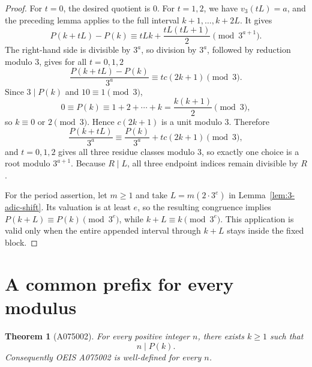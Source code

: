 \documentclass[11pt]{amsart}
\newtheorem{theorem}{Theorem}[section]
\theoremstyle{remark}
\begin{document}
\begin{proof}
For \(t=0\), the desired quotient is \(0\).  For \(t=1,2\), we have
\(v_3(tL)=a\), and the preceding lemma applies to the full interval
\(k+1,\ldots,k+2L\).  It gives
\[
P(k+tL)-P(k)
 \equiv tLk+\frac{tL(tL+1)}2\pmod{3^{a+1}}.
\]
The right-hand side is divisible by \(3^a\), so division by \(3^a\), followed by
reduction modulo \(3\), gives for all \(t=0,1,2\)
\begin{equation}\label{eq:3-adic-sweep}
\frac{P(k+tL)-P(k)}{3^a}
 \equiv tc(2k+1)\pmod3.
\end{equation}
Since \(3\mid P(k)\) and \(10\equiv1\pmod3\),
\[
0\equiv P(k)\equiv1+2+\cdots+k=\frac{k(k+1)}2\pmod3,
\]
so \(k\equiv0\) or \(2\pmod3\).  Hence \(c(2k+1)\) is a unit modulo \(3\).  Therefore
\[
\frac{P(k+tL)}{3^a}
 \equiv \frac{P(k)}{3^a}+tc(2k+1)\pmod3,
\]
and \(t=0,1,2\) gives all three residue classes modulo \(3\), so exactly one choice
is a root modulo \(3^{a+1}\).  Because \(R\mid L\), all three endpoint indices remain
divisible by \(R\).

For the period assertion, let \(m\ge1\) and take \(L=m(2\cdot3^e)\) in
Lemma~\ref{lem:3-adic-shift}.  Its valuation is at least \(e\), so the resulting
congruence implies \(P(k+L)\equiv P(k)\pmod{3^e}\), while \(k+L\equiv k\pmod{3^e}\).
This application is valid only when the entire appended interval through \(k+L\) stays
inside the fixed block.
\end{proof}

\section{A common prefix for every modulus}
\label{sec:common-prefix}

\begin{theorem}[A075002]\label{thm:A075002}
For every positive integer \(n\), there exists \(k\ge1\) such that
\[
n\mid P(k).
\]
Consequently OEIS A075002 is well-defined for every \(n\).
\end{theorem}
\end{document}
